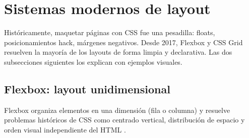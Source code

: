 \documentclass[11pt,a4paper,openany]{book}
\begin{document}
\section{Sistemas modernos de layout}

Históricamente, maquetar páginas con CSS fue una pesadilla:
floats, posicionamientos hack, márgenes negativos. Desde 2017,
Flexbox y CSS Grid resuelven la mayoría de los layouts de forma
limpia y declarativa. Las dos subsecciones siguientes los explican
con ejemplos visuales.


\subsection{Flexbox: layout unidimensional}

Flexbox organiza elementos en una dimensión (fila o columna) y resuelve
problemas históricos de CSS como centrado vertical, distribución de
espacio y orden visual independiente del HTML \cite{robbins2018learning}.
\end{document}
